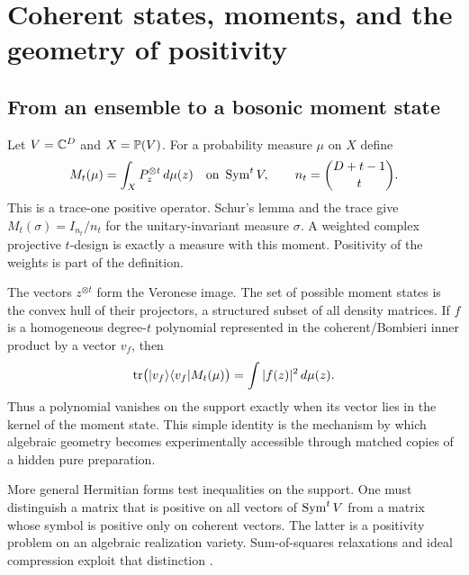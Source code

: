 \section{Coherent states, moments, and the geometry of positivity}
\label{sec:foundations}

\subsection{From an ensemble to a bosonic moment state}

Let $V=\mathbb C^D$ and $X=\mathbb P(V)$. For a probability measure $\mu$ on $X$ define
\[
M_t(\mu)=\int_X P_z^{\otimes t}\,d\mu(z)
\quad\text{on }\operatorname{Sym}^t V,
\qquad n_t=\binom{D+t-1}{t}.
\]
This is a trace-one positive operator. Schur's lemma and the trace give
$M_t(\sigma)=I_{n_t}/n_t$ for the unitary-invariant measure $\sigma$.
A weighted complex projective $t$-design is exactly a measure with this
moment. Positivity of the weights is part of the definition.

The vectors $z^{\otimes t}$ form the Veronese image. The set of possible
moment states is the convex hull of their projectors, a structured subset
of all density matrices. If $f$ is a homogeneous degree-$t$ polynomial
represented in the coherent/Bombieri inner product by a vector $v_f$, then
\[
\operatorname{tr}\bigl(|v_f\rangle\langle v_f|M_t(\mu)\bigr)
=\int|f(z)|^2\,d\mu(z).
\]
Thus a polynomial vanishes on the support exactly when its vector lies in
the kernel of the moment state. This simple identity is the mechanism by
which algebraic geometry becomes experimentally accessible through matched
copies of a hidden pure preparation.

More general Hermitian forms test inequalities on the support. One must
distinguish a matrix that is positive on all vectors of $\operatorname{Sym}^t V$ from a
matrix whose symbol is positive only on coherent vectors. The latter is a
positivity problem on an algebraic realization variety. Sum-of-squares
relaxations and ideal compression exploit that distinction
\citep{Rao2024,GouveiaParriloThomas2010}.


